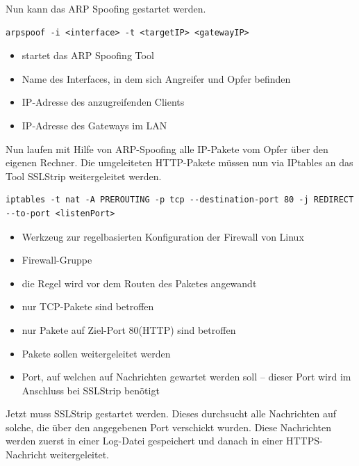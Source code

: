Nun kann das ARP Spoofing gestartet werden.

\begin{lstlisting}
arpspoof -i <interface> -t <targetIP> <gatewayIP>
\end{lstlisting}

\begin{itemize}
	\item {} startet das ARP Spoofing Tool
	\item {} Name des Interfaces, in dem sich Angreifer und Opfer befinden
	\item {} IP-Adresse des anzugreifenden Clients
	\item {} IP-Adresse des Gateways im LAN
\end{itemize}

Nun laufen mit Hilfe von ARP-Spoofing alle IP-Pakete vom Opfer über den eigenen Rechner. Die umgeleiteten HTTP-Pakete müssen nun via IPtables an das Tool SSLStrip weitergeleitet werden.

\begin{lstlisting}
iptables -t nat -A PREROUTING -p tcp --destination-port 80 -j REDIRECT --to-port <listenPort>
\end{lstlisting}

\begin{itemize}
	\item {} Werkzeug zur regelbasierten Konfiguration der Firewall von Linux
	\item {} Firewall-Gruppe
	\item {} die Regel wird vor dem Routen des Paketes angewandt
	\item {}  nur TCP-Pakete sind betroffen
	\item {} nur Pakete auf Ziel-Port 80(HTTP) sind betroffen
	\item {} Pakete sollen weitergeleitet werden
	\item {} Port, auf welchen auf Nachrichten gewartet werden soll -- dieser Port wird im Anschluss bei SSLStrip benötigt
\end{itemize}

Jetzt muss SSLStrip gestartet werden. Dieses durchsucht alle Nachrichten auf solche, die über den angegebenen Port  verschickt wurden. Diese Nachrichten werden zuerst in einer Log-Datei gespeichert und danach in einer HTTPS-Nachricht weitergeleitet.

